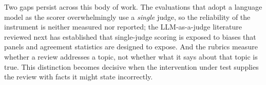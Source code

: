 Two gaps persist across this body of work. The evaluations that adopt a language
model as the scorer overwhelmingly use a \emph{single} judge, so the reliability of
the instrument is neither measured nor reported; the LLM-as-a-judge literature
reviewed next has established that single-judge scoring is exposed to biases that
panels and agreement statistics are designed to expose. And the rubrics measure
whether a review addresses a topic, not whether what it says about that topic is
true. This distinction becomes decisive when the intervention under test
supplies the review with facts it might state incorrectly.
